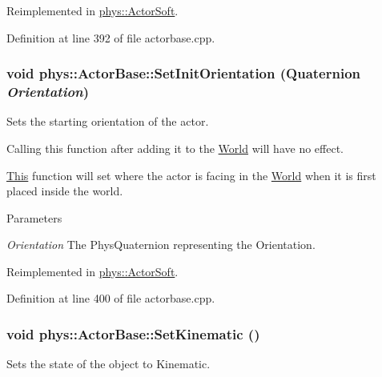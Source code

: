 Reimplemented in \hyperlink{classphys_1_1ActorSoft_abbb6f5cce15d4efee91acd4825c75801}{phys::ActorSoft}.



Definition at line 392 of file actorbase.cpp.

\hypertarget{classphys_1_1ActorBase_a681186465db767954ca3f9530a1d7c36}{
\subsubsection[{SetInitOrientation}]{\setlength{\rightskip}{0pt plus 5cm}void phys::ActorBase::SetInitOrientation ({\bf Quaternion} {\em Orientation})}}
\label{d8/d0f/classphys_1_1ActorBase_a681186465db767954ca3f9530a1d7c36}


Sets the starting orientation of the actor. 

Calling this function after adding it to the \hyperlink{classphys_1_1World}{World} will have no effect. \par
 \hyperlink{structThis}{This} function will set where the actor is facing in the \hyperlink{classphys_1_1World}{World} when it is first placed inside the world. 
\begin{DoxyParams}{Parameters}
\item[{\em Orientation}]The PhysQuaternion representing the Orientation. \end{DoxyParams}


Reimplemented in \hyperlink{classphys_1_1ActorSoft_adde8ecfb7188b8cbb238e88da18ac95e}{phys::ActorSoft}.



Definition at line 400 of file actorbase.cpp.

\hypertarget{classphys_1_1ActorBase_acd5613286ec14fb2a8e5ed5f5003dc5f}{
\subsubsection[{SetKinematic}]{\setlength{\rightskip}{0pt plus 5cm}void phys::ActorBase::SetKinematic ()}}
\label{d8/d0f/classphys_1_1ActorBase_acd5613286ec14fb2a8e5ed5f5003dc5f}


Sets the state of the object to Kinematic. 


